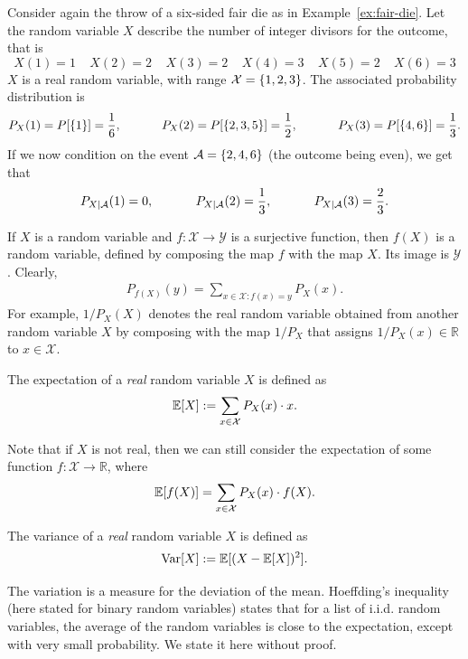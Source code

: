 \begin{example}
Consider again the throw of a six-sided fair die as in Example~\ref{ex:fair-die}. Let the random variable $X$ describe the number of integer divisors for the outcome, that is
\[X(1) = 1 \ \ \ \ \ X(2) = 2 \ \ \ \ \ X(3) = 2 \ \ \ \ \ X(4) = 3 \ \ \ \ \ X(5) = 2 \ \ \ \ \ X(6) = 3
\]
$X$ is a real random variable, with range $\mathcal{X} = \{1,2,3\}$. The associated probability distribution is
\[P_X(1) = P[\{1\}] = \frac{1}{6}, \ \ \ \ \ \ \ \ \ \ P_X(2) = P[\{2,3,5\}] = \frac{1}{2}, \ \ \ \ \ \ \ \ \ \ P_X(3) = P[\{4,6\}] = \frac{1}{3}.
\]
If we now condition on the event $\mathcal{A} = \{2,4,6\}$ (the outcome being even), we get that
\[P_{X | \evA}(1) = 0, \ \ \ \ \ \ \ \ \ \ P_{X | \evA}(2) = \frac{1}{3}, \ \ \ \ \ \ \ \ \ \ P_{X | \evA}(3) = \frac{2}{3}.
\]
\end{example}
If $X$ is a random variable and $f : \mathcal{X} \to \mathcal{Y}$ is a surjective function, then $f(X)$ is a random variable, defined by composing the map $f$ with the map $X$. Its image is $\mathcal{Y}$. Clearly,
\begin{align}
P_{f(X)}(y) = \sum_{x \in \mathcal{X} : f(x) = y} P_X(x).
\end{align}
For example, $1/P_X(X)$ denotes the real random variable obtained from another random variable $X$ by composing with the map $1/P_X$ that assigns $1/P_X(x) \in \mathbb{R}$ to $x \in \mathcal{X}$.

\begin{definition}[Expectation]
The expectation of a \emph{real} random variable $X$ is defined as
\[
\mathbb{E}[X] := \sum_{x \in \mathcal{X}} P_X(x) \cdot x.
\]
\end{definition}
Note that if $X$ is not real, then we can still consider the expectation of some function $f : \mathcal{X} \to \mathbb{R}$, where
\begin{align}
\mathbb{E}[f(X)] = \sum_{x \in \mathcal{X}} P_X(x) \cdot f(X).
\end{align}
\begin{definition}[Variance]
The variance of a \emph{real} random variable $X$ is defined as
\[
\mathrm{Var}[X] := \mathbb{E}[(X - \mathbb{E}[X])^2].
\]
\end{definition}
The variation is a measure for the deviation of the mean. Hoeffding's inequality (here stated for binary random variables) states that for a list of i.i.d. random variables, the average of the random variables is close to the expectation, except with very small probability. We state it here without proof.

